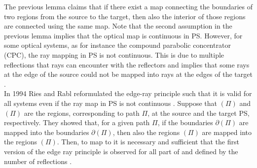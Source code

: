The previous lemma claims that if there exist a map connecting the boundaries of two regions from the source to the target, then also the interior of those regions are connected using the same map. Note that the second assumption in the previous lemma implies that the optical map is continuous in PS.
However, for some optical systems, as for instance the compound parabolic concentrator (CPC), the ray mapping in PS is not continuous. This is due to multiple reflections that rays can encounter with the reflectors and implies that some rays at the edge of the source could not be mapped into rays at the edges of the target \cite{davies1994edge}. \\ \indent 
In 1994 Ries and Rabl reformulated the edge-ray principle such that it is valid for all systems even if the ray map in PS is not continuous \cite{Ries:2}. 
Suppose that $(\Pi)$ and $(\Pi)$ are the regions, corresponding to path $\Pi$, at the source and the target PS, respectively. 
They showed that, for a given path $\Pi$, if the boundaries
$\partial$$(\Pi)$ are mapped into the boundaries $\partial$$(\Pi)$, then also the regions $(\Pi)$ are mapped into the regions $(\Pi)$.
Then, to map  to  it is necessary and sufficient that the first version of the edge ray principle is observed for all part of  and  defined by the number of reflections \cite{Ries:2}. 
